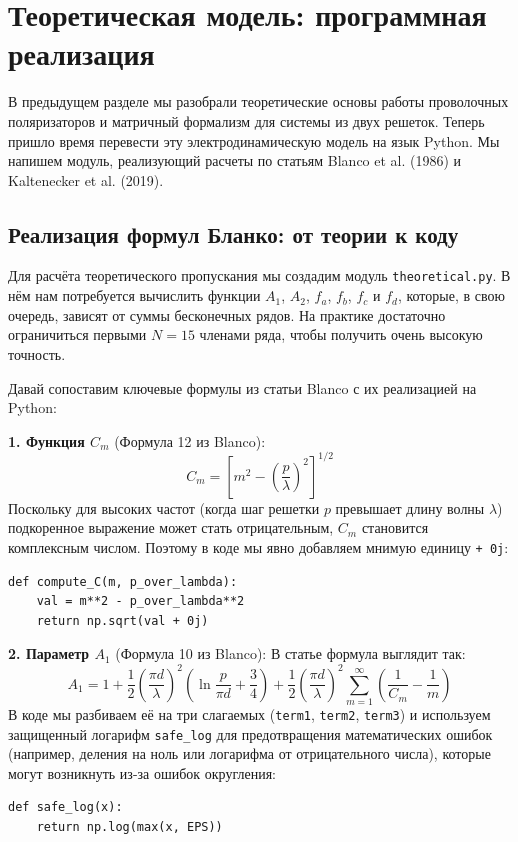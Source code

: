 
\section{Теоретическая модель: программная реализация}

В предыдущем разделе мы разобрали теоретические основы работы проволочных поляризаторов и матричный формализм для системы из двух решеток. Теперь пришло время перевести эту электродинамическую модель на язык Python. Мы напишем модуль, реализующий расчеты по статьям Blanco et al. (1986) и Kaltenecker et al. (2019).

\subsection{Реализация формул Бланко: от теории к коду}

Для расчёта теоретического пропускания мы создадим модуль \texttt{theoretical.py}. В нём нам потребуется вычислить функции $A_1$, $A_2$, $f_a$, $f_b$, $f_c$ и $f_d$, которые, в свою очередь, зависят от суммы бесконечных рядов. На практике достаточно ограничиться первыми $N=15$ членами ряда, чтобы получить очень высокую точность.

Давай сопоставим ключевые формулы из статьи Blanco с их реализацией на Python:

\textbf{1. Функция $C_m$} (Формула 12 из Blanco):
\begin{equation*}
C_m = \left[ m^2 - \left(\frac{p}{\lambda}\right)^2 \right]^{1/2}
\end{equation*}
Поскольку для высоких частот (когда шаг решетки $p$ превышает длину волны $\lambda$) подкоренное выражение может стать отрицательным, $C_m$ становится комплексным числом. Поэтому в коде мы явно добавляем мнимую единицу \texttt{+ 0j}:
\begin{verbatim}
def compute_C(m, p_over_lambda):
    val = m**2 - p_over_lambda**2
    return np.sqrt(val + 0j)
\end{verbatim}

\textbf{2. Параметр $A_1$} (Формула 10 из Blanco):
В статье формула выглядит так:
\begin{equation*}
A_1 = 1 + \frac{1}{2}\left(\frac{\pi d}{\lambda}\right)^2 \left( \ln\frac{p}{\pi d} + \frac{3}{4} \right) + \frac{1}{2}\left(\frac{\pi d}{\lambda}\right)^2 \sum_{m=1}^\infty \left( \frac{1}{C_m} - \frac{1}{m} \right)
\end{equation*}
В коде мы разбиваем её на три слагаемых (\texttt{term1}, \texttt{term2}, \texttt{term3}) и используем защищенный логарифм \texttt{safe\_log} для предотвращения математических ошибок (например, деления на ноль или логарифма от отрицательного числа), которые могут возникнуть из-за ошибок округления:
\begin{verbatim}
def safe_log(x):
    return np.log(max(x, EPS))
\end{verbatim}

